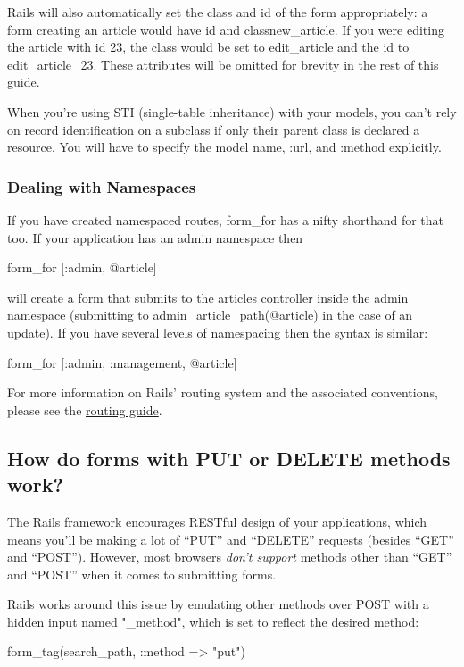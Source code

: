 \documentclass[10pt]{book}
\newenvironment{code}{%
  \scriptsize
    \verbatim
}{%
    \endverbatim
    \newline
}
\begin{document}
Rails will also automatically set the class and id of the form appropriately: a form creating an article would have id and classnew\_article. If you were editing the article with id 23, the class would be set to edit\_article and the id to edit\_article\_23. These attributes will be omitted for brevity in the rest of this guide.

When you’re using STI  (single-table inheritance) with your models, you can’t rely on record  identification on a subclass if only their parent class is declared a  resource. You will have to specify the model name, :url, and :method explicitly.

\subsubsection{ Dealing with Namespaces}

If you have created namespaced routes, form\_for has a nifty shorthand for that too. If your application has an admin namespace then
\begin{code}
form_for [:admin, @article]
\end{code}

will create a form that submits to the articles controller inside the admin namespace (submitting to admin\_article\_path(@article) in the case of an update). If you have several levels of namespacing then the syntax is similar:
\begin{code}
form_for [:admin, :management, @article]
\end{code}

For more information on Rails’ routing system and the associated conventions, please see the \href{http://guides.rubyonrails.org/routing.html}{routing guide}.

\subsection{ How do forms with PUT or DELETE methods work?}

The Rails framework encourages RESTful design of your applications, which means you’ll be making a lot of “PUT” and “DELETE” requests (besides “GET” and “POST”). However, most browsers \emph{don’t support} methods other than “GET” and “POST” when it comes to submitting forms.

Rails works around this issue by emulating other methods over POST with a hidden input named "\_method", which is set to reflect the desired method:
\begin{code}
form_tag(search_path, :method => "put")
\end{code}
\end{document}
